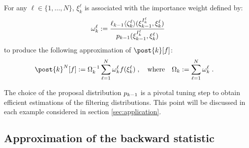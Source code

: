 \documentclass{article}
\newcommand{\N}{N}
\newcommand{\kissforward}[3][]
{\ifthenelse{\equal{#1}{}}{p_{#2}}
{\ifthenelse{\equal{#1}{fully}}{p^{\star}_{#2}}
{\ifthenelse{\equal{#1}{smooth}}{\tilde{r}_{#2}}{\mathrm{erreur}}}}}
\newcommand{\eqdef}{\ensuremath{:=}}
\newcommand{\eqsp}{\;}
\newcommand{\ewght}[2]{\ensuremath{\omega_{#1}^{#2}}}
\newcommand{\epart}[2]{\ensuremath{\xi_{#1}^{#2}}}
\newcommand{\sumwght}[2][]{%
\ifthenelse{\equal{#1}{}}{\ensuremath{\Omega_{#2}}}{\ensuremath{\Omega_{#2}^{(#1)}}}}
\newcommand{\hatqg}[1]{\mathsf{\ell}_{#1}}
\newcounter{example}[section]
\begin{document}
For any  $\ell \in\{1, \dots, \N\}$, $\epart{k}{\ell}$ is associated with the  importance weight defined by:
\begin{equation}
\label{eq:weight-update-filtering}
    \ewght{k}{\ell} \eqdef \frac{\hatqg{k-1}\langle\zeta_k^{\ell}\rangle(\epart{k-1}{I_k^{\ell}},\epart{k}{\ell}) }{ \kissforward{k-1}{k-1}(\epart{k-1}{I_k^{\ell}},\epart{k}{\ell})}
\end{equation}
to produce the following approximation of $\post{k}[f]$:
\begin{align*}
\post{k}^\N[f]&\eqdef \sumwght{k}^{-1}\sum_{\ell=1}^N \ewght{k}{\ell}f(\epart{k}{\ell})\eqsp,\quad\mbox{where}\quad\sumwght{k}\eqdef \sum_{\ell=1}^\N \ewght{k}{\ell}\eqsp.
\end{align*}

The choice of the proposal distribution $\kissforward{k-1}{k-1}$ is a pivotal tuning step to obtain efficient estimations of the filtering distributions. 
This point will be discussed in each example considered in section \ref{sec:application}.

\subsection{Approximation of the backward statistic}
\label{sec:smoothing}
\end{document}
